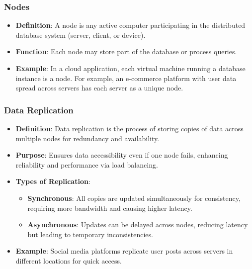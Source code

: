 \documentclass[aspectratio=169]{beamer}
\begin{document}
\begin{frame}[fragile]
  \frametitle{Nodes}
  \begin{itemize}
    \item \textbf{Definition}: A node is any active computer participating in the distributed database system (server, client, or device).
    \item \textbf{Function}: Each node may store part of the database or process queries.
    \item \textbf{Example}: In a cloud application, each virtual machine running a database instance is a node. For example, an e-commerce platform with user data spread across servers has each server as a unique node.
  \end{itemize}
\end{frame}

\begin{frame}[fragile]
  \frametitle{Data Replication}
  \begin{itemize}
    \item \textbf{Definition}: Data replication is the process of storing copies of data across multiple nodes for redundancy and availability.
    \item \textbf{Purpose}: Ensures data accessibility even if one node fails, enhancing reliability and performance via load balancing.
    \item \textbf{Types of Replication}:
    \begin{itemize}
      \item \textbf{Synchronous}: All copies are updated simultaneously for consistency, requiring more bandwidth and causing higher latency.
      \item \textbf{Asynchronous}: Updates can be delayed across nodes, reducing latency but leading to temporary inconsistencies.
    \end{itemize}
    \item \textbf{Example}: Social media platforms replicate user posts across servers in different locations for quick access.
  \end{itemize}
\end{frame}
\end{document}

